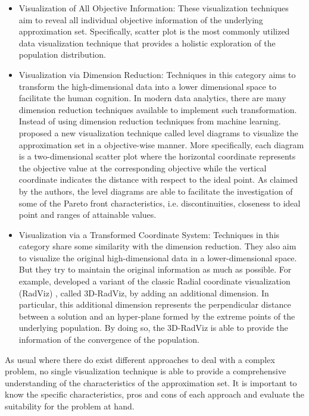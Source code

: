 \begin{itemize}
\item Visualization of All Objective Information: These visualization techniques aim to reveal all individual objective information of the underlying approximation set. Specifically, scatter plot is the most commonly utilized data visualization technique that provides a holistic exploration of the population distribution. 

\item Visualization via Dimension Reduction: Techniques in this category aims to transform the high-dimensional data into a lower dimensional space to facilitate the human cognition. In modern data analytics, there are many dimension reduction techniques available to implement such transformation.  Instead of using dimension reduction techniques from machine learning. \citet{Blasco2008} proposed a new visualization technique called level diagrams to visualize the approximation set in a objective-wise manner. More specifically, each diagram is a two-dimensional scatter plot where the horizontal coordinate represents the objective value at the corresponding objective while the vertical coordinate indicates the distance with respect to the ideal point. As claimed by the authors, the level diagrams are able to facilitate the investigation of some of the Pareto front characteristics, i.e. discontinuities, closeness to ideal point and ranges of attainable values. 

\item Visualization via a Transformed Coordinate System: Techniques in this category share some similarity with the dimension reduction. They also aim to visualize the original high-dimensional data in a lower-dimensional space. But they try to maintain the original information as much as possible. For example, \citet{Ibrahim2016} developed a variant of the classic Radial coordinate visualization (RadViz) \citep{Hoffman2002}, called 3D-RadViz, by adding an additional dimension. In particular, this additional dimension represents the perpendicular distance between a solution and an hyper-plane formed by the extreme points of the underlying population. By doing so, the 3D-RadViz is able to provide the information of the convergence of the population. 
\end{itemize}

As usual where there do exist different approaches to deal with a complex problem, no single visualization technique is able to provide a comprehensive understanding of the characteristics of the approximation set. It is important to know the specific characteristics, pros and cons of each approach and evaluate the suitability for the problem at hand.
  
